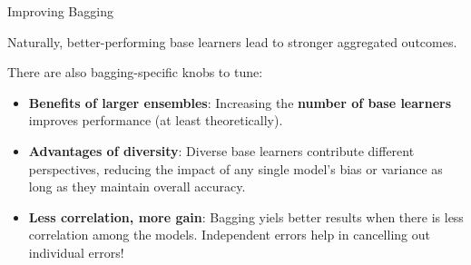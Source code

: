 \documentclass[11pt,compress,t,notes=noshow, xcolor=table]{beamer}
\begin{document}
\begin{vbframe}{Improving Bagging}

Naturally, better-performing base learners lead to stronger aggregated outcomes. \\

\vspace{2em}

There are also bagging-specific knobs to tune:
\begin{itemize}
  \item \textbf{Benefits of larger ensembles}: Increasing the \textbf{number of base learners} improves performance (at least theoretically).
  \item \textbf{Advantages of diversity}: Diverse base learners contribute different perspectives, reducing the impact of any single model's bias or variance as long as they maintain overall accuracy.
  \item \textbf{Less correlation, more gain}: Bagging yiels better results when there is less correlation among the models. Independent errors help in cancelling out individual errors!
\end{itemize}


\end{vbframe}
\end{document}
